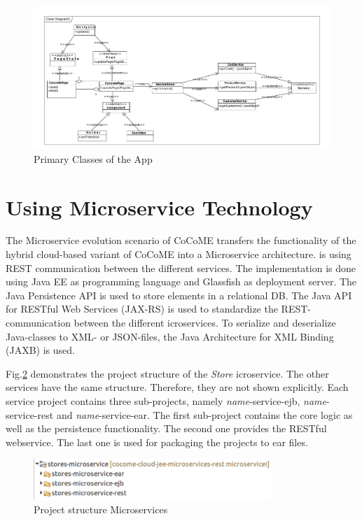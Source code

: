   
   \begin{figure}
  	\includegraphics[width=\textwidth]{img/appBasicClass.pdf}
  	\caption{Primary Classes of the App}
  	\label{App_ClassDiagram}
  \end{figure}

\FloatBarrier
 
 
 \section{Using Microservice Technology} \label{MicroserviceImplementation}
 The Microservice evolution scenario of CoCoME transfers the functionality of the hybrid cloud-based variant of CoCoME into a Microservice architecture.
  is using REST communication between the different services. 
 The implementation is done using Java EE as programming language and Glassfish as deployment server. 
 The Java Persistence API is used to store elements in a relational DB. 
 The Java API for RESTful Web Services (JAX-RS) is used to standardize the REST-communication between the different icroservices. 
 To serialize and deserialize Java-classes to XML- or JSON-files, the Java Architecture for XML Binding (JAXB) is used. 

 Fig.\added{~}\ref{projectStructure} demonstrates the project structure of the \textit{Store} icroservice. 
 The other services have the same structure. 
 Therefore, they are not shown explicitly.  
 Each service project contains three sub-projects, namely \textit{name}-service-ejb, \textit{name}-service-rest and \textit{name}-service-ear. 
 The first sub-project contains the core logic as well as the persistence functionality. 
 The second one provides the RESTful webservice. 
 The last one is used for packaging the projects to ear files. 
 
 
 

 
	\begin{figure}[h]
		\centering
		\includegraphics[width = 0.8\textwidth] {img/projectStructure_Micro.pdf}
	 	\caption{Project structure Microservices}
	 	\label{projectStructure}
	 	
 	\end{figure}
 	
